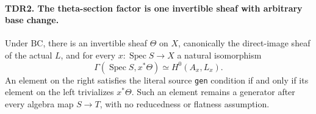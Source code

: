 \paragraph{TDR2. The theta-section factor is one invertible sheaf with arbitrary base change.}
\label{claim:TDR2}
Under \(\mathrm{BC}\), there is an invertible sheaf \(\Theta\) on
\(X\), canonically the direct-image sheaf of the actual \(L\), and
for every \(x:\operatorname{Spec}S\to X\) a natural isomorphism
\[
 \Gamma(\operatorname{Spec}S,x^*\Theta)
       \simeq H^0(A_x,L_x).                                 \tag{TDR.4}
\]
An element on the right satisfies the literal source \texttt{gen}
condition if and only if its element on the left trivializes
\(x^*\Theta\).  Such an element remains a generator after every
algebra map \(S\to T\), with no reducedness or flatness assumption.

